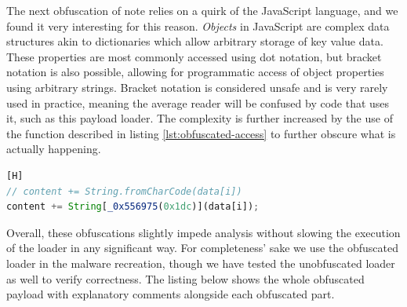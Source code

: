The next obfuscation of note relies on a quirk of the JavaScript language, and we found it very interesting for this
reason. \emph{Objects} in JavaScript are complex data structures akin to dictionaries which allow arbitrary storage of
key value data. These properties are most commonly accessed using dot notation, but bracket notation is also possible,
allowing for programmatic access of object properties using arbitrary strings. Bracket notation is considered unsafe and 
is very rarely used in practice, meaning the average reader will be confused by code that uses it, such as this payload
loader. The complexity is further increased by the use of the function described in listing \ref{lst:obfuscated-access} 
to further obscure what is actually happening.

\begin{lstlisting}[language=JavaScript, caption={Bracket notation object property access with obfuscated argument.}][H]
// content += String.fromCharCode(data[i])
content += String[_0x556975(0x1dc)](data[i]); 
\end{lstlisting}

Overall, these obfuscations slightly impede analysis without slowing the execution of the loader in any significant way.
For completeness' sake we use the obfuscated loader in the malware recreation, though we have tested the unobfuscated
loader as well to verify correctness. The listing below shows the whole obfuscated payload with explanatory comments
alongside each obfuscated part.

